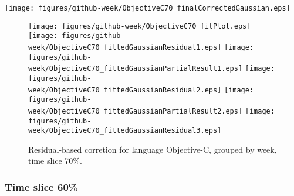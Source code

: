 \begin{center}
{\texttt{[image: figures/github-week/ObjectiveC70\_finalCorrectedGaussian.eps]}}
\end{center}

\FloatBarrier

\begin{figure}[t]
\centering
{}
{\texttt{[image: figures/github-week/ObjectiveC70\_fitPlot.eps]}}
{\texttt{[image: figures/github-week/ObjectiveC70\_fittedGaussianResidual1.eps]}}
{\texttt{[image: figures/github-week/ObjectiveC70\_fittedGaussianPartialResult1.eps]}}
{\texttt{[image: figures/github-week/ObjectiveC70\_fittedGaussianResidual2.eps]}}
{\texttt{[image: figures/github-week/ObjectiveC70\_fittedGaussianPartialResult2.eps]}}
{\texttt{[image: figures/github-week/ObjectiveC70\_fittedGaussianResidual3.eps]}}
\caption{Residual-based corretion for language Objective-C, grouped by week, time slice 70\%.}
\end{figure}


\FloatBarrier


\subsubsection{Time slice 60\%}

